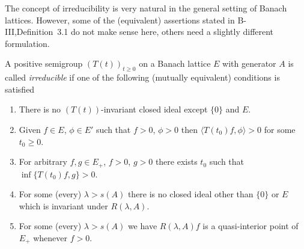 The concept of irreducibility is very natural in the general setting of Banach lattices.
However, some of the (equivalent) assertions stated in B-III,Definition~3.1 do not make sense here, others need a slightly different formulation.
\begin{definition}\label{def:c3-3.1}
	
	A positive semigroup $(T(t))_{t\geq 0}$ on a Banach lattice $E$ with generator $A$ is called \emph{irreducible} if one of the following (mutually equivalent) conditions is satisfied
	\begin{enumerate}
	\item
	There is no $(T(t))$-invariant closed ideal except $\{0\}$ and $E$.
	
	\item 
	Given $f \in E$, $\phi \in E'$ such that $f > 0$, $\phi > 0$ then $\langle T(t_{0})f,\phi \rangle > 0$ for some $t_{0} \geq 0$.
	
	\item 
	For arbitrary $f,g \in E_{+}$, $f > 0$, $g > 0$ there exists $t_{0}$ such that $\inf\{T(t_{0})f,g\} > 0$.
	
	\item 
	For some (every) $\lambda > s(A)$ there is no closed ideal other than $\{0\}$ or $E$ which is invariant under $R(\lambda,A)$.
	
	\item 
	For some (every) $\lambda > s(A)$ we have $R(\lambda,A)f$ is a quasi-interior point of $E_{+}$ whenever $f > 0$.
	\end{enumerate}
\end{definition}

